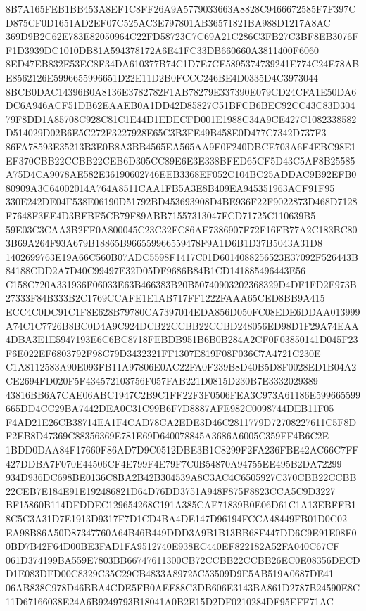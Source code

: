 \documentclass[UTF8,fontset=fandol,zihao=-4,a4paper]{ctexart}
\begin{document}
{{8B7A165FEB1BB453A8EF1C8FF26A9A5779033663A8828C9466672585F7F397CD875CF0D1651AD2EF07C525AC3E797801AB36571821BA988D1217A8AC
369D9B2C62E783E82050964C22FD58723C7C69A21C286C3FB27C3BF8EB3076FF1D3939DC1010DB81A594378172A6E41FC33DB660660A3811400F6060
8ED47EB832E53EC8F34DA610377B74C1D7E7CE5895374739241E774C24E78ABE8562126E5996655996651D22E11D2B0FCCC246BE4D0335D4C3973044
8BCB0DAC14396B0A8136E3782782F1AB78279E337390E079CD24CFA1E50DA6DC6A946ACF51DB62EAAEB0A1DD42D85827C51BFCB6BEC92CC43C83D304
79F8DD1A85708C928C81C1E44D1EDECFD001E1988C34A9CE427C1082338582D514029D02B6E5C272F3227928E65C3B3FE49B458E0D477C7342D737F3
86FA78593E35213B3E0B8A3BB4565EA565AA9F0F240DBCE703A6F4EBC98E1EF370CBB22CCBB22CEB6D305CC89E6E3E338BFED65CF5D43C5AF8B25585
A75D4CA9078AE582E36190602746EEB3368EF052C104BC25ADDAC9B92EFB080909A3C64002014A764A8511CAA1FB5A3E8B409EA945351963ACF91F95
330E242DE04F538E06190D51792BD453693908D4BE936F22F9022873D468D7128F7648F3EE4D3BFBF5CB79F89ABB71557313047FCD71725C110639B5
59E03C3CAA3B2FF0A800045C23C32FC86AE7386907F72F16FB77A2C183BC803B69A264F93A679B18865B966559966559478F9A1D6B1D37B5043A31D8
1402699763E19A66C560B07ADC5598F1417C01D6014088256523E37092F526443B84188CDD2A7D40C99497E32D05DF9686B84B1CD141885496443E56
C158C720A331936F06033E63B466383B20B50740903202368329D4DF1FD2F973B27333F84B333B2C1769CCAFE1E1AB717FF1222FAAA65CED8BB9A415
ECC4C0DC91C1F8E628B79780CA7397014EDA856D050FC08EDE6DDAA013999A74C1C7726B8BC0D4A9C924DCB22CCBB22CCBD248056ED98D1F29A74EAA
4DBA3E1E5947193E6C6BC8718FEBDB951B6B0B284A2CF0F03850141D045F23F6E022EF6803792F98C79D3432321FF1307E819F08F036C7A4721C230E
C1A8112583A90E093FB11A97806E0AC22FA0F239B8D40B5D8F0028ED1B04A2CE2694FD020F5F434572103756F057FAB221D0815D230B7E3332029389
43816BB6A7CAE06ABC1947C2B9C1FF22F3F0506FEA3C973A61186E599665599665DD4CC29BA7442DEA0C31C99B6F7D8887AFE982C0098744DEB11F05
F4AD21E26CB38714EA1F4CAD78CA2EDE3D46C2811779D72708227611C5F8DF2EB8D47369C88356369E781E69D640078845A3686A6005C359FF4B6C2E
1BDD0DAA84F17660F86AD7D9C0512DBE3B1C8299F2FA236FBE42AC66C7FF427DDBA7F070E44506CF4E799F4E79F7C0B54870A94755EE495B2DA72299
934D936DC698BE0136C8BA2B42B304539A8C3AC4C6505927C370CBB22CCBB22CEB7E184E91E192486821D64D76DD3751A948F875F8823CCA5C9D3227
BF15860B114DFDDEC129654268C191A385CAE71839B0E06D61C1A13EBFFB18C5C3A31D7E1913D9317F7D1CD4BA4DE147D96194FCCA48449FB01D0C02
EA98B86A50D87347760A64B46B449DDD3A9B1B13BB68F447DD6C9E91E08F00BD7B42F64D00BE3FAD1FA9512740E938EC440EF822182A52FA040C67CF
061D374199BA559E7803BB66747611300CB72CCBB22CCBB26EC0E08356DECDD1E083DFD00C8329C35C29CB4833A89725C53509D9E5AB519A0687DE41
06AB838C978D46BBA4CDE5FB0AEF88C3DB606E3143BA861D2787B24590E8C11D67166038E24A6B9249793B18041A0B2E15D2DF0210284DF95EFF71AC
}}
\end{document}
